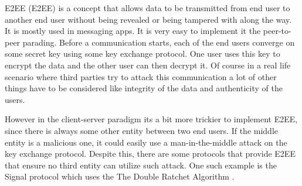 E2EE (\acl{E2EE}) is a concept that allows data to be transmitted from end user to another end user without being revealed or being tampered with along the way. It is mostly used in messaging apps. It is very easy to implement it the peer-to-peer parading. Before a communication starts, each of the end users converge on some secret key using some key exchange protocol. One user uses this key to encrypt the data and the other user can then decrypt it. Of course in a real life scenario where third parties try to attack this communication a lot of other things have to be considered like integrity of the data and authenticity of the users.

However in the client-server paradigm its a bit more trickier to implement E2EE, since there is always some other entity between two end users. If the middle entity is a malicious one, it could easily use a man-in-the-middle attack on the key exchange protocol. Despite this, there are some protocols that provide E2EE that ensure no third entity can utilize such attack. One such example is the Signal protocol which uses the The Double Ratchet Algorithm \cite{Marlinspike2016}.
